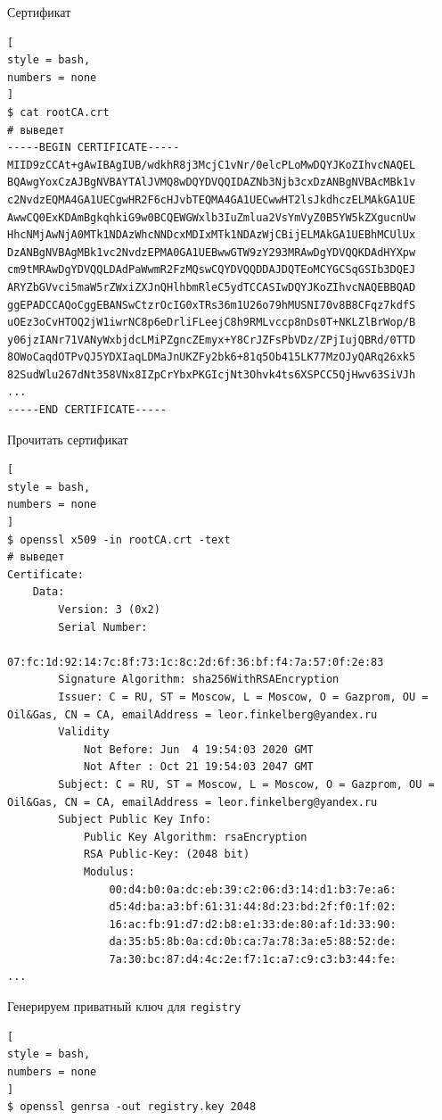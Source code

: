 \documentclass[%
	11pt,
	a4paper,
	utf8,
		]{article}
\begin{document}
Сертификат
\begin{lstlisting}[
style = bash,
numbers = none
]
$ cat rootCA.crt
# выведет
-----BEGIN CERTIFICATE-----
MIID9zCCAt+gAwIBAgIUB/wdkhR8j3McjC1vNr/0elcPLoMwDQYJKoZIhvcNAQEL
BQAwgYoxCzAJBgNVBAYTAlJVMQ8wDQYDVQQIDAZNb3Njb3cxDzANBgNVBAcMBk1v
c2NvdzEQMA4GA1UECgwHR2F6cHJvbTEQMA4GA1UECwwHT2lsJkdhczELMAkGA1UE
AwwCQ0ExKDAmBgkqhkiG9w0BCQEWGWxlb3IuZmlua2VsYmVyZ0B5YW5kZXgucnUw
HhcNMjAwNjA0MTk1NDAzWhcNNDcxMDIxMTk1NDAzWjCBijELMAkGA1UEBhMCUlUx
DzANBgNVBAgMBk1vc2NvdzEPMA0GA1UEBwwGTW9zY293MRAwDgYDVQQKDAdHYXpw
cm9tMRAwDgYDVQQLDAdPaWwmR2FzMQswCQYDVQQDDAJDQTEoMCYGCSqGSIb3DQEJ
ARYZbGVvci5maW5rZWxiZXJnQHlhbmRleC5ydTCCASIwDQYJKoZIhvcNAQEBBQAD
ggEPADCCAQoCggEBANSwCtzrOcIG0xTRs36m1U26o79hMUSNI70v8B8CFqz7kdfS
uOEz3oCvHTOQ2jW1iwrNC8p6eDrliFLeejC8h9RMLvccp8nDs0T+NKLZlBrWop/B
y06jzIANr71VANyWxbjdcLMiPZgncZEmyx+Y8CrJZFsPbVDz/ZPjIujQBRd/0TTD
8OWoCaqdOTPvQJ5YDXIaqLDMaJnUKZFy2bk6+81q5Ob415LK77MzOJyQARq26xk5
82SudWlu267dNt358VNx8IZpCrYbxPKGIcjNt3Ohvk4ts6XSPCC5QjHwv63SiVJh
...
-----END CERTIFICATE-----
\end{lstlisting}

Прочитать сертификат
\begin{lstlisting}[
style = bash,
numbers = none
]
$ openssl x509 -in rootCA.crt -text
# выведет
Certificate:
    Data:
        Version: 3 (0x2)
        Serial Number:
            07:fc:1d:92:14:7c:8f:73:1c:8c:2d:6f:36:bf:f4:7a:57:0f:2e:83
        Signature Algorithm: sha256WithRSAEncryption
        Issuer: C = RU, ST = Moscow, L = Moscow, O = Gazprom, OU = Oil&Gas, CN = CA, emailAddress = leor.finkelberg@yandex.ru
        Validity
            Not Before: Jun  4 19:54:03 2020 GMT
            Not After : Oct 21 19:54:03 2047 GMT
        Subject: C = RU, ST = Moscow, L = Moscow, O = Gazprom, OU = Oil&Gas, CN = CA, emailAddress = leor.finkelberg@yandex.ru
        Subject Public Key Info:
            Public Key Algorithm: rsaEncryption
            RSA Public-Key: (2048 bit)
            Modulus:
                00:d4:b0:0a:dc:eb:39:c2:06:d3:14:d1:b3:7e:a6:
                d5:4d:ba:a3:bf:61:31:44:8d:23:bd:2f:f0:1f:02:
                16:ac:fb:91:d7:d2:b8:e1:33:de:80:af:1d:33:90:
                da:35:b5:8b:0a:cd:0b:ca:7a:78:3a:e5:88:52:de:
                7a:30:bc:87:d4:4c:2e:f7:1c:a7:c9:c3:b3:44:fe:
...
\end{lstlisting}

Генерируем приватный ключ для \texttt{registry}
\begin{lstlisting}[
style = bash,
numbers = none
]
$ openssl genrsa -out registry.key 2048
\end{lstlisting}
\end{document}
